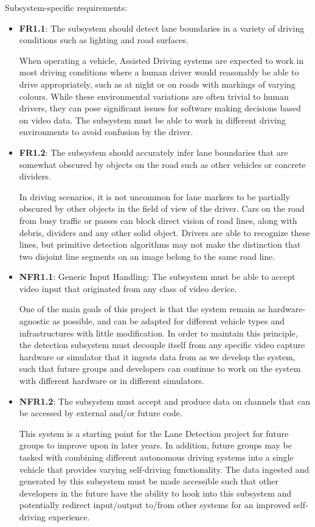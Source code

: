 \documentclass[titlepage, draft]{article}
\begin{document}
Subsystem-specific requirements:
\begin{itemize}
	\item \textbf{FR1.1}: The subsystem should detect lane boundaries in a variety of driving conditions such as lighting and
	      road surfaces.

	      When operating a vehicle, Assisted Driving systems are expected to work in most driving conditions where a human driver
	      would reasonably be able to drive appropriately, such as at night or on roads with markings of varying colours.
	      While these environmental variations are often trivial to human drivers, they can pose significant issues for software
	      making decisions based on video data.
	      The subsystem must be able to work in different driving environments to avoid confusion by the driver.
	\item \textbf{FR1.2}: The subsystem should accurately infer lane boundaries that are somewhat obscured by objects on the
	      road such as other vehicles or concrete dividers.

	      In driving scenarios, it is not uncommon for lane markers to be partially obscured by other objects in the field of view
	      of the driver.
	      Cars on the road from busy traffic or passes can block direct vision of road lines, along with debris, dividers and any
	      other solid object.
	      Drivers are able to recognize these lines, but primitive detection algorithms may not make the distinction that two disjoint
	      line segments on an image belong to the same road line.
	\item \textbf{NFR1.1}: Generic Input Handling: The subsystem must be able to accept video input that originated from any
	      class of video device.

	      One of the main goals of this project is that the system remain as hardware-agnostic as possible, and can be adapted for
	      different vehicle types and infrastructures with little modification.
	      In order to maintain this principle, the detection subsystem must decouple itself from any specific video capture hardware or
	      simulator that it ingests data from as we develop the system, such that future groups and developers can continue to work
	      on the system with different hardware or in different simulators.
	\item \textbf{NFR1.2}: The subsystem must accept and produce data on channels that can be accessed by external and/or future code.

	      This system is a starting point for the Lane Detection project for future groups to improve upon in later years.
	      In addition, future groups may be tasked with combining different autonomous driving systems into a single vehicle that provides
	      varying self-driving functionality.
	      The data ingested and generated by this subsystem must be made accessible such that other developers in the future have the
	      ability to hook into this subsystem and potentially redirect input/output to/from other systems for an improved self-driving
	      experience.
\end{itemize}
\end{document}
